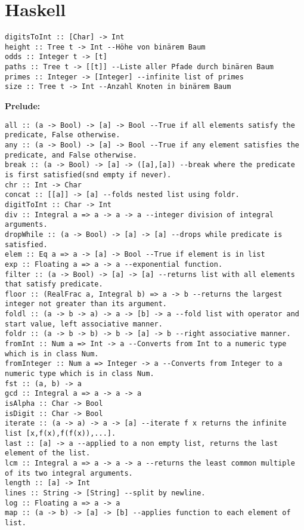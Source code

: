 \documentclass{article}
\begin{document}
\section{Haskell}%
\begin{verbatim}
digitsToInt :: [Char] -> Int
height :: Tree t -> Int --Höhe von binärem Baum
odds :: Integer t -> [t]
paths :: Tree t -> [[t]] --Liste aller Pfade durch binären Baum
primes :: Integer -> [Integer] --infinite list of primes
size :: Tree t -> Int --Anzahl Knoten in binärem Baum
\end{verbatim}
\vspace{-1mm}

\noindent\textbf{Prelude:}
\vspace{-2mm}
\begin{verbatim}
all :: (a -> Bool) -> [a] -> Bool --True if all elements satisfy the predicate, False otherwise.
any :: (a -> Bool) -> [a] -> Bool --True if any element satisfies the predicate, and False otherwise.
break :: (a -> Bool) -> [a] -> ([a],[a]) --break where the predicate is first satisfied(snd empty if never).
chr :: Int -> Char
concat :: [[a]] -> [a] --folds nested list using foldr.
digitToInt :: Char -> Int
div :: Integral a => a -> a -> a --integer division of integral arguments.
dropWhile :: (a -> Bool) -> [a] -> [a] --drops while predicate is satisfied.
elem :: Eq a => a -> [a] -> Bool --True if element is in list
exp :: Floating a => a -> a --exponential function.
filter :: (a -> Bool) -> [a] -> [a] --returns list with all elements that satisfy predicate.
floor :: (RealFrac a, Integral b) => a -> b --returns the largest integer not greater than its argument.
foldl :: (a -> b -> a) -> a -> [b] -> a --fold list with operator and start value, left associative manner.
foldr :: (a -> b -> b) -> b -> [a] -> b --right associative manner.
fromInt :: Num a => Int -> a --Converts from Int to a numeric type which is in class Num.
fromInteger :: Num a => Integer -> a --Converts from Integer to a numeric type which is in class Num. 
fst :: (a, b) -> a
gcd :: Integral a => a -> a -> a
isAlpha :: Char -> Bool
isDigit :: Char -> Bool
iterate :: (a -> a) -> a -> [a] --iterate f x returns the infinite list [x,f(x),f(f(x)),...].
last :: [a] -> a --applied to a non empty list, returns the last element of the list.
lcm :: Integral a => a -> a -> a --returns the least common multiple of its two integral arguments.
length :: [a] -> Int
lines :: String -> [String] --split by newline.
log :: Floating a => a -> a
map :: (a -> b) -> [a] -> [b] --applies function to each element of list.

\end{verbatim}
\end{document}
